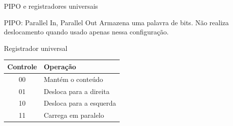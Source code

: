 \begin{frame}{PIPO e registradores universais}
\begin{block}{PIPO: Parallel In, Parallel Out}
Armazena uma palavra de bits. Não realiza deslocamento quando usado apenas
nessa configuração.
\end{block}

\begin{block}{Registrador universal}
\end{block}

\begin{center}
\renewcommand{\arraystretch}{1.3}
\begin{tabular}{c|l}
Controle & Operação \\
\hline
00 & Mantém o conteúdo \\
01 & Desloca para a direita \\
10 & Desloca para a esquerda \\
11 & Carrega em paralelo \\
\end{tabular}
\end{center}
\end{frame}